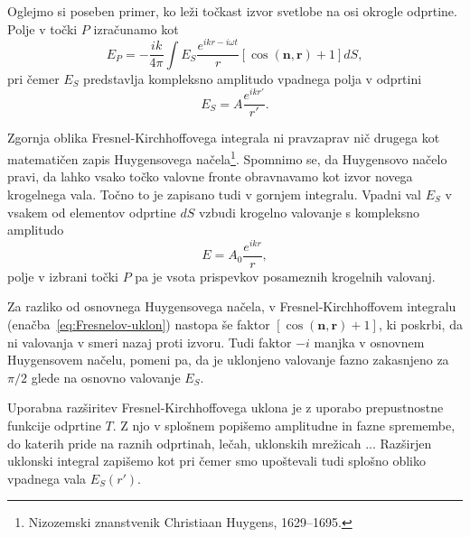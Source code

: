 Oglejmo si poseben primer, ko leži točkast izvor svetlobe na osi okrogle odprtine. Polje 
v točki $P$ izračunamo kot 
\begin{equation}
\label{eq:Fresnelov-uklon}
E_P =  -\frac{ik}{4\pi} \int E_S\frac{ e^{ikr-i\omega t}}{r}\left[\cos(\mathbf{n},\mathbf{r})+1\right] dS,
\end{equation}
pri čemer $E_S$ predstavlja kompleksno amplitudo vpadnega polja v odprtini
\begin{equation}
E_S = A \frac{e^{ikr'}}{r'}.
\end{equation} 

Zgornja oblika Fresnel-Kirchhoffovega integrala ni pravzaprav nič drugega kot 
matematičen zapis Huygensovega 
načela\footnote{Nizozemski znanstvenik Christiaan Huygens, 1629--1695.}. 
Spomnimo se, da Huygensovo načelo pravi, da lahko vsako točko valovne fronte obravnavamo 
kot izvor novega krogelnega vala. Točno to je zapisano tudi v gornjem integralu. Vpadni val
$E_S$ v vsakem od elementov odprtine $dS$ vzbudi krogelno valovanje s
kompleksno amplitudo
\begin{equation}
E = A_0 \frac{e^{ikr}}{r},
\end{equation} 
polje v izbrani točki $P$ pa je vsota prispevkov posameznih krogelnih valovanj.

Za razliko od osnovnega Huygensovega načela, v Fresnel-Kirchhoffovem integralu 
(enačba~\ref{eq:Fresnelov-uklon})
nastopa še faktor $\left[\cos(\mathbf{n},\mathbf{r})+1\right]$, ki poskrbi, da ni valovanja 
v smeri nazaj proti izvoru. Tudi faktor $-i$ manjka v osnovnem Huygensovem načelu,
pomeni pa, da je uklonjeno valovanje fazno zakasnjeno za $\pi/2$ glede na osnovno
valovanje $E_S$.

Uporabna razširitev Fresnel-Kirchhoffovega uklona je z uporabo prepustnostne funkcije odprtine $T$.
Z njo v splošnem popišemo amplitudne in fazne spremembe, do katerih pride na raznih 
odprtinah, lečah, uklonskih mrežicah ... Razširjen uklonski integral zapišemo kot
pri čemer smo upoštevali tudi splošno obliko vpadnega vala $E_S(r')$.

